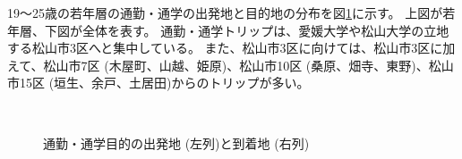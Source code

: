 \documentclass[a4paper,12pt, uplatex]{jsbook}
\begin{document}
19〜25歳の若年層の通勤・通学の出発地と目的地の分布を図\ref{fig:od_commute_young}に示す。
上図が若年層、下図が全体を表す。
通勤・通学トリップは、愛媛大学や松山大学の立地する松山市3区へと集中している。
また、松山市3区に向けては、松山市3区に加えて、松山市7区 (木屋町、山越、姫原)、松山市10区 (桑原、畑寺、東野)、松山市15区 (垣生、余戸、土居田)からのトリップが多い。
%
\begin{figure}[htbp]
  \centering
  \\%
    \caption{通勤・通学目的の出発地 (左列)と到着地 (右列)}
  	\label{fig:od_commute_young}
\end{figure}
\end{document}
